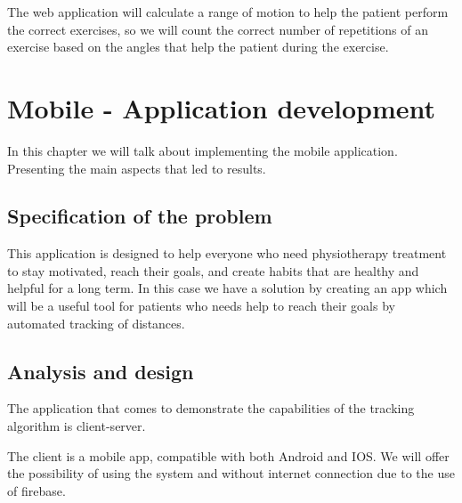 The web application will calculate a range of motion to help the patient perform the correct exercises, so we will count the correct number of repetitions of an exercise based on the angles that help the patient during the exercise.

\section{Mobile - Application development}

In this chapter we will talk about implementing the mobile application. 
Presenting the main aspects that led to results.

\subsection{Specification of the problem}
 
\par This application is designed to help everyone who need physiotherapy treatment to stay motivated,
 reach their goals, and create habits that are healthy and helpful for a long term. 
 In this case we have a solution by creating an app which will be a useful tool for patients who needs help to reach their goals by automated tracking of distances.
 
\subsection{Analysis and design}
The application that comes to demonstrate the capabilities of the tracking algorithm is client-server.


The client is a mobile app, compatible with both Android and IOS.
We will offer the possibility of using the system and without internet connection due to the use of firebase.


